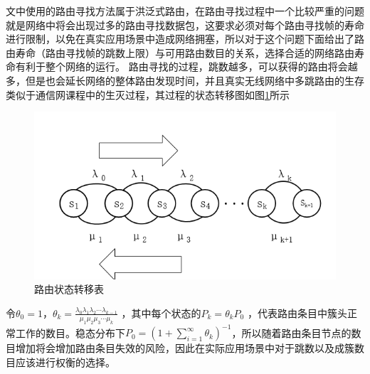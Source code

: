\documentclass[a4paper,AutoFakeBold,oneside,12pt]{book}
\begin{document}
  文中使用的路由寻找方法属于洪泛式路由，在路由寻找过程中一个比较严重的问题就是网络中将会出现过多的路由寻找数据包，这要求必须对每个路由寻找帧的寿命进行限制，以免在真实应用场景中造成网络拥塞，所以对于这个问题下面给出了路由寿命（路由寻找帧的跳数上限）与可用路由数目的关系，选择合适的网络路由寿命有利于整个网络的运行。
  路由寻找的过程，跳数越多，可以获得的路由将会越多，但是也会延长网络的整体路由发现时间，并且真实无线网络中多跳路由的生存类似于通信网课程中的生灭过程，其过程的状态转移图如图\ref{shengmie}所示
\begin{figure}[H]
 \centering 
\includegraphics[scale=0.5]{pictures/shengmie.png} 
 \caption{路由状态转移表 
 }\label{shengmie}
\end{figure}


 
  令$\theta_0=1$，$\theta_k=\frac{\lambda_0\lambda_1\lambda_2\cdots\lambda_{k-1}}{\mu_1\mu_2\mu_3\cdots\mu_k}$ ，其中每个状态的$P_k=\theta_k P_0$  ，代表路由条目中簇头正常工作的数目。稳态分布下$P_0=\left(1+\displaystyle\sum_{i=1}^{\infty}\theta_k\right)^{-1}$，所以随着路由条目节点的数目增加将会增加路由条目失效的风险，因此在实际应用场景中对于跳数以及成簇数目应该进行权衡的选择。
  
\end{document}
